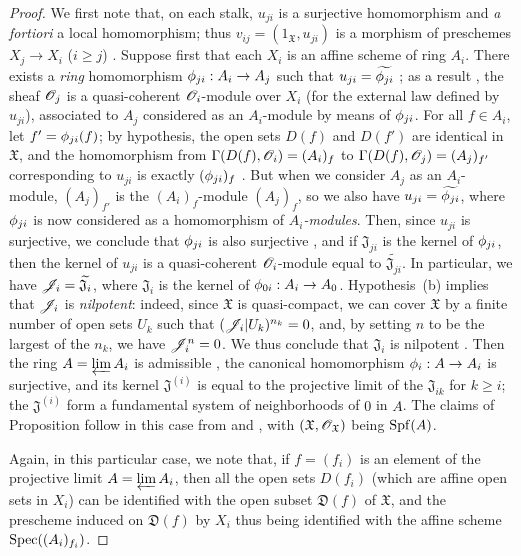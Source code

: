 \begin{proof}
We first note that, on each stalk, $u_{ji}$ is a surjective homomorphism and \emph{a fortiori} a local homomorphism; thus $v_{ij}=(1_\mathfrak{X},u_{ji})$ is a morphism of preschemes $X_j\to X_i$ ($i\geq j$) .
Suppose first that each $X_i$ is an affine scheme of ring $A_i$.
There exists a \emph{ring} homomorphism $\vphi_{ji}:A_i\to A_j$ such that $u_{ji}=\widetilde{\phi_{ji}}$ ; as a result , the sheaf $\mathscr{O}_j$ is a quasi-coherent $\mathscr{O}_i$-module over $X_i$ (for the external law defined by $u_{ji}$), associated to $A_j$ considered as an $A_i$-module by means of $\phi_{ji}$.
For all $f\in A_i$, let $f'=\phi_{ji}(f)$; by hypothesis, the open sets $D(f)$ and $D(f')$ are identical in $\mathfrak{X}$, and the homomorphism from $\Gamma(D(f),\mathscr{O}_i)=(A_i)_f$ to $\Gamma(D(f),\mathscr{O}_j)=(A_j)_{f'}$ corresponding to $u_{ji}$ is exactly $(\phi_{ji})_f$ .
But when we consider $A_j$ as an $A_i$-module, $(A_j)_{f'}$ is the $(A_i)_f$-module $(A_j)_f$, so we also have $u_{ji}=\widetilde{\phi_{ji}}$, where $\phi_{ji}$ is now considered as a homomorphism of \emph{$A_i$-modules}.
Then, since $u_{ji}$ is surjective, we conclude that $\phi_{ji}$ is also surjective , and if $\mathfrak{J}_{ji}$ is the kernel of $\phi_{ji}$, then the kernel of $u_{ji}$ is a quasi-coherent $\mathscr{O}_i$-module equal to $\widetilde{\mathfrak{J}_{ji}}$.
In particular, we have $\mathscr{J}_i=\widetilde{\mathfrak{J}_i}$, where $\mathfrak{J}_i$ is the kernel of $\vphi_{0i}:A_i\to A_0$.
Hypothesis~(b) implies that $\mathscr{J}_i$ is \emph{nilpotent}: indeed, since $\mathfrak{X}$ is quasi-compact, we can cover $\mathfrak{X}$ by a finite number of open sets $U_k$ such that $(\mathscr{J}_i|U_k)^{n_k}=0$, and, by setting $n$ to be the largest of the $n_k$, we have $\mathscr{J}_i^n=0$.
We thus conclude that $\mathfrak{J}_i$ is nilpotent .
Then the ring $A=\varprojlim A_i$ is admissible , the canonical homomorphism $\vphi_i:A\to A_i$ is surjective, and its kernel $\mathfrak{J}^{(i)}$ is equal to the projective limit of the $\mathfrak{J}_{ik}$ for $k\geq i$; the $\mathfrak{J}^{(i)}$ form a fundamental system of neighborhoods of $0$ in $A$.
The claims of Proposition  follow in this case from  and , with $(\mathfrak{X},\mathscr{O}_\mathfrak{X})$ being $\operatorname{Spf}(A)$.

Again, in this particular case, we note that, if $f=(f_i)$ is an element of the projective limit $A=\varprojlim A_i$, then all the open sets $D(f_i)$ (which are affine open sets in $X_i$) can be identified with the open subset $\mathfrak{D}(f)$ of $\mathfrak{X}$, and the prescheme induced on $\mathfrak{D}(f)$ by $X_i$ thus being identified with the affine scheme $\operatorname{Spec}((A_i)_{f_i})$.


\end{proof}
